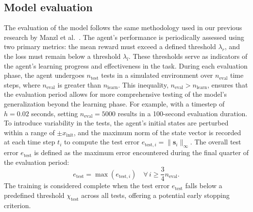 \subsection{Model evaluation} \label{subsec: Model evaluation}
The evaluation of the model follows the same methodology used in our previous research by Manzl et al.~\cite{manzl2023relrl}. The agent's performance is periodically assessed using two primary metrics: the mean reward must exceed a defined threshold \( \lambda_r \), and the loss must remain below a threshold \( \lambda_l \). These thresholds serve as indicators of the agent's learning progress and effectiveness in the task. 
During each evaluation phase, the agent undergoes \( n_{\text{test}} \) tests in a simulated environment over \( n_{\text{eval}} \) time steps, where \( n_{\text{eval}} \) is greater than \( n_{\text{learn}} \). This inequality, \( n_{\text{eval}} > n_{\text{learn}} \), ensures that the evaluation period allows for more comprehensive testing of the model's generalization beyond the learning phase.
For example, with a timestep of \( h = 0.02 \) seconds, setting \( n_{\text{eval}} = 5000 \) results in a 100-second evaluation duration.
To introduce variability in the tests, the agent's initial states are perturbed within a range of \( \pm x_{\text{init}} \), and the maximum norm of the state vector is recorded at each time step \( t_i \) to compute the test error \( e_{\text{test},i} = \|\mathbf{s}_i\|_{\infty} \). The overall test error \( e_{\text{test}} \) is defined as the maximum error encountered during the final quarter of the evaluation period:
\begin{equation}
	e_{\text{test}} = \max(e_{\text{test},i}) \quad \forall \, i \geq \frac{3}{4}n_{\text{eval}}.
\end{equation}
The training is considered complete when the test error \( e_{\text{test}} \) falls below a predefined threshold \( \chi_{\text{test}} \) across all tests, offering a potential early stopping criterion.
